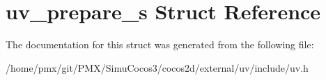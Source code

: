 \hypertarget{structuv__prepare__s}{}\section{uv\+\_\+prepare\+\_\+s Struct Reference}
\label{structuv__prepare__s}


The documentation for this struct was generated from the following file\+:\begin{DoxyCompactItemize}
\item 
/home/pmx/git/\+P\+M\+X/\+Simu\+Cocos3/cocos2d/external/uv/include/uv.\+h\end{DoxyCompactItemize}
